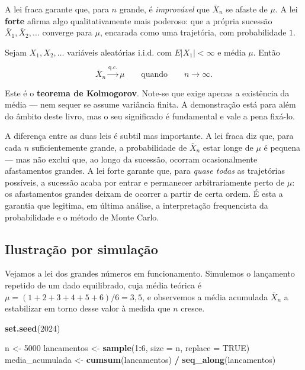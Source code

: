 \documentclass[
  portuguese,
  11pt,
  openany]{book}
\newenvironment{Shaded}{\begin{snugshade}}{\end{snugshade}}
\newcommand{\AttributeTok}[1]{\textcolor[rgb]{0.13,0.29,0.53}{#1}}
\newcommand{\ConstantTok}[1]{\textcolor[rgb]{0.56,0.35,0.01}{#1}}
\newcommand{\DecValTok}[1]{\textcolor[rgb]{0.00,0.00,0.81}{#1}}
\newcommand{\FunctionTok}[1]{\textcolor[rgb]{0.13,0.29,0.53}{\textbf{#1}}}
\newcommand{\NormalTok}[1]{#1}
\newcommand{\OtherTok}[1]{\textcolor[rgb]{0.56,0.35,0.01}{#1}}
\newcommand{\SpecialCharTok}[1]{\textcolor[rgb]{0.81,0.36,0.00}{\textbf{#1}}}
\begin{document}
A lei fraca garante que, para \(n\) grande, é \emph{improvável} que \(\bar{X}_n\) se
afaste de \(\mu\). A lei \textbf{forte} afirma algo qualitativamente mais poderoso: que
a própria sucessão \(\bar{X}_1, \bar{X}_2, \ldots\) converge para \(\mu\), encarada
como uma trajetória, com probabilidade \(1\).

Sejam \(X_1, X_2, \ldots\) variáveis aleatórias i.i.d. com \(E|X_1| < \infty\) e
média \(\mu\). Então

\[
\bar{X}_n \xrightarrow{\text{q.c.}} \mu
\qquad \text{quando} \qquad n \to \infty.
\]

Este é o \textbf{teorema de Kolmogorov}. Note-se que exige apenas a existência da
média --- nem sequer se assume variância finita. A demonstração está para além do
âmbito deste livro, mas o seu significado é fundamental e vale a pena fixá-lo.

A diferença entre as duas leis é subtil mas importante. A lei fraca diz que,
para cada \(n\) suficientemente grande, a probabilidade de \(\bar{X}_n\) estar longe
de \(\mu\) é pequena --- mas não exclui que, ao longo da sucessão, ocorram
ocasionalmente afastamentos grandes. A lei forte garante que, para \emph{quase todas}
as trajetórias possíveis, a sucessão acaba por entrar e permanecer arbitrariamente
perto de \(\mu\): os afastamentos grandes deixam de ocorrer a partir de certa
ordem. É esta a garantia que legitima, em última análise, a interpretação
frequencista da probabilidade e o método de Monte Carlo.

\subsection{Ilustração por simulação}\label{ilustrauxe7uxe3o-por-simulauxe7uxe3o}

Vejamos a lei dos grandes números em funcionamento. Simulemos o lançamento
repetido de um dado equilibrado, cuja média teórica é
\(\mu = (1+2+3+4+5+6)/6 = 3{,}5\), e observemos a média acumulada
\(\bar{X}_n\) a estabilizar em torno desse valor à medida que \(n\) cresce.

\begin{Shaded}
\begin{Highlighting}[]
\FunctionTok{set.seed}\NormalTok{(}\DecValTok{2024}\NormalTok{)}

\NormalTok{n }\OtherTok{\textless{}{-}} \DecValTok{5000}
\NormalTok{lancamentos   }\OtherTok{\textless{}{-}} \FunctionTok{sample}\NormalTok{(}\DecValTok{1}\SpecialCharTok{:}\DecValTok{6}\NormalTok{, }\AttributeTok{size =}\NormalTok{ n, }\AttributeTok{replace =} \ConstantTok{TRUE}\NormalTok{)}
\NormalTok{media\_acumulada }\OtherTok{\textless{}{-}} \FunctionTok{cumsum}\NormalTok{(lancamentos) }\SpecialCharTok{/} \FunctionTok{seq\_along}\NormalTok{(lancamentos)}
\end{Highlighting}
\end{Shaded}
\end{document}
